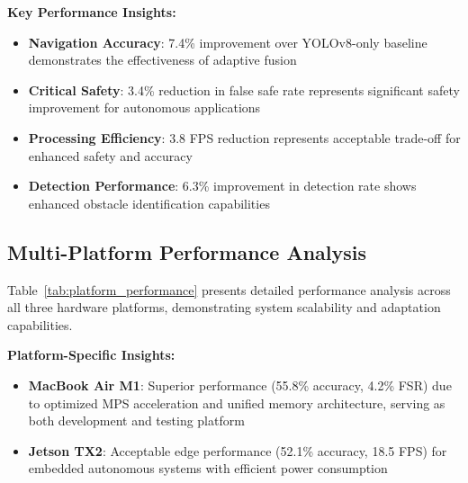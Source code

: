 \documentclass[10pt]{article}
\newcommand{\tabref}[1]{Table~\ref{#1}}
\begin{document}
\textbf{Key Performance Insights:}

\begin{itemize}
\item \textbf{Navigation Accuracy}: 7.4\% improvement over YOLOv8-only baseline demonstrates the effectiveness of adaptive fusion
\item \textbf{Critical Safety}: 3.4\% reduction in false safe rate represents significant safety improvement for autonomous applications
\item \textbf{Processing Efficiency}: 3.8 FPS reduction represents acceptable trade-off for enhanced safety and accuracy
\item \textbf{Detection Performance}: 6.3\% improvement in detection rate shows enhanced obstacle identification capabilities
\end{itemize}

\subsection{Multi-Platform Performance Analysis}

\tabref{tab:platform_performance} presents detailed performance analysis across all three hardware platforms, demonstrating system scalability and adaptation capabilities.

\begin{table}[ht]
\centering
\caption{Multi-Platform Performance Comparison}
\label{tab:platform_performance}
\end{table}

\textbf{Platform-Specific Insights:}
\begin{itemize}
\item \textbf{MacBook Air M1}: Superior performance (55.8\% accuracy, 4.2\% FSR) due to optimized MPS acceleration and unified memory architecture, serving as both development and testing platform
\item \textbf{Jetson TX2}: Acceptable edge performance (52.1\% accuracy, 18.5 FPS) for embedded autonomous systems with efficient power consumption
\end{itemize}
\end{document}
